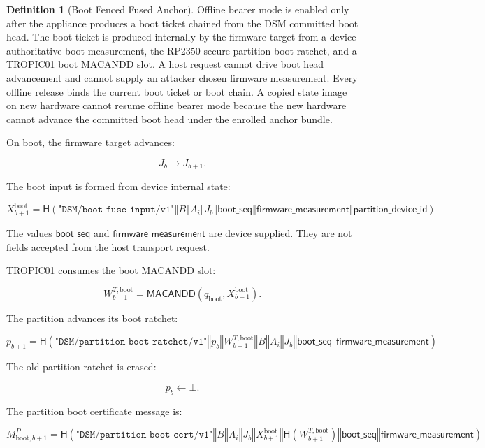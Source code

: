 \documentclass[11pt]{article}
\theoremstyle{definition}
\newtheorem{definition}[theorem]{Definition}
\theoremstyle{remark}
\newcommand{\concat}{\ensuremath{\mathbin{\Vert}}}
\newcommand{\Hf}{\ensuremath{\mathsf{H}}}
\newcommand{\MACD}{\ensuremath{\mathsf{MACANDD}}}
\newcommand{\ctx}[1]{\texttt{"#1"}}
\newcommand{\Bundle}{\ensuremath{B}}
\newcommand{\Ahead}{\ensuremath{A}}
\newcommand{\Bhead}{\ensuremath{J}}
\begin{document}
\begin{definition}[Boot Fenced Fused Anchor]
Offline bearer mode is enabled only after the appliance produces a boot ticket chained from the
DSM committed boot head. The boot ticket is produced internally by the firmware target from a
device authoritative boot measurement, the RP2350 secure partition boot ratchet, and a TROPIC01
boot MACANDD slot. A host request cannot drive boot head advancement and cannot supply an attacker
chosen firmware measurement. Every offline release binds the current boot ticket or boot chain. A
copied state image on new hardware cannot resume offline bearer mode because the new hardware
cannot advance the committed boot head under the enrolled anchor bundle.
\end{definition}

On boot, the firmware target advances:

\[
\Bhead_b\rightarrow\Bhead_{b+1}.
\]

The boot input is formed from device internal state:

\[
X^{\mathrm{boot}}_{b+1}
=
\Hf(
  \ctx{DSM/boot-fuse-input/v1}
  \concat \Bundle
  \concat \Ahead_i
  \concat \Bhead_b
  \concat \mathsf{boot\_seq}
  \concat \mathsf{firmware\_measurement}
  \concat \mathsf{partition\_device\_id}
).
\]

The values \(\mathsf{boot\_seq}\) and \(\mathsf{firmware\_measurement}\) are device supplied.
They are not fields accepted from the host transport request.

TROPIC01 consumes the boot MACANDD slot:

\[
W^{T,\mathrm{boot}}_{b+1}
=
\MACD(q_{\mathrm{boot}},X^{\mathrm{boot}}_{b+1}).
\]

The partition advances its boot ratchet:

\[
p_{b+1}
=
\Hf(
  \ctx{DSM/partition-boot-ratchet/v1}
  \concat p_b
  \concat W^{T,\mathrm{boot}}_{b+1}
  \concat \Bundle
  \concat \Ahead_i
  \concat \Bhead_b
  \concat \mathsf{boot\_seq}
  \concat \mathsf{firmware\_measurement}
).
\]

The old partition ratchet is erased:

\[
p_b\leftarrow\bot.
\]

The partition boot certificate message is:

\[
M^P_{\mathrm{boot},b+1}
=
\Hf(
    \ctx{DSM/partition-boot-cert/v1}
    \concat \Bundle
    \concat \Ahead_i
    \concat \Bhead_b
    \concat X^{\mathrm{boot}}_{b+1}
    \concat \Hf(W^{T,\mathrm{boot}}_{b+1})
    \concat \mathsf{boot\_seq}
    \concat \mathsf{firmware\_measurement}
).
\]
\end{document}
